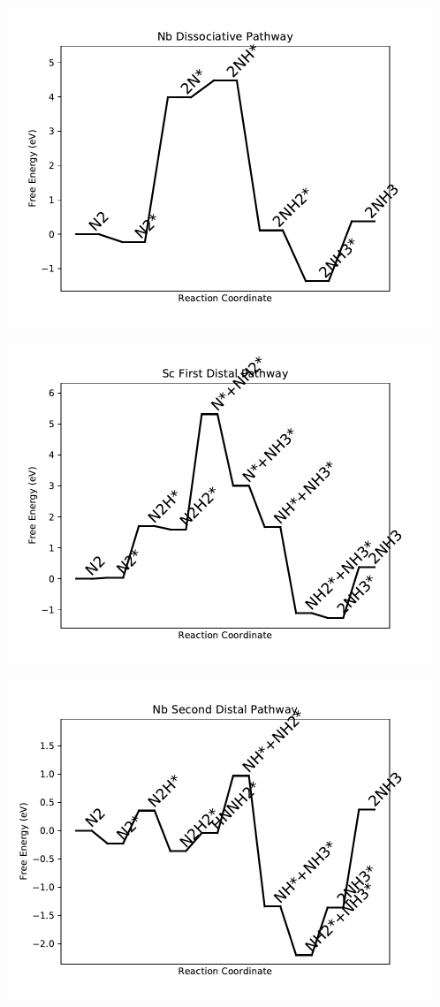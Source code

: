 \begin{figure}
\centering
\includegraphics[width=0.8\linewidth]{data/plots/Nb_dissociative.pdf}
\end{figure}

\begin{figure}
\centering
\includegraphics[width=0.8\linewidth]{data/plots/Sc_distal_1.pdf}
\end{figure}

\begin{figure}
\centering
\includegraphics[width=0.8\linewidth]{data/plots/Nb_distal_2.pdf}
\end{figure}

